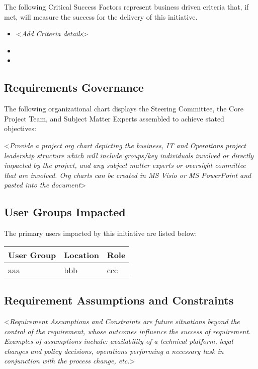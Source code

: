 \documentclass[english,12pt]{scrartcl}
\newcommand{\comment}[1]{\textless\textit{#1}\textgreater\vspace*{1ex}}
\begin{document}
The following Critical Success Factors represent business driven criteria that, if met, will measure the success for the delivery of this initiative. 
 
\begin{itemize}
\item \comment{Add Criteria details}
\item 
\item 
\end{itemize}
 
\subsection{Requirements Governance}
The following organizational chart displays the Steering Committee, the Core Project Team, and Subject Matter Experts assembled to achieve stated objectives:
 
\comment{Provide a project org chart depicting the business, IT and Operations project leadership structure which will include groups/key individuals involved or directly impacted by the project, and any subject matter experts or oversight committee that are involved.  Org charts can be created in MS Visio or MS PowerPoint and pasted into the document}
 
 
\subsection{User Groups Impacted}
 
The primary users impacted by this initiative are listed below: 
 
\begin{tabular}{p{}p{}p{}} \toprule
User Group &	Location &	Role \\ \midrule
aaa & bbb & ccc \\ \bottomrule
\end{tabular}
 
 
\subsection{Requirement Assumptions and Constraints}
 
 
\comment{Requirement Assumptions and Constraints are future situations beyond the control of the requirement, whose outcomes influence the success of requirement. Examples of assumptions include: availability of a technical platform, legal changes and policy decisions, operations performing a necessary task in conjunction with the process change, etc.}
 
\end{document}
